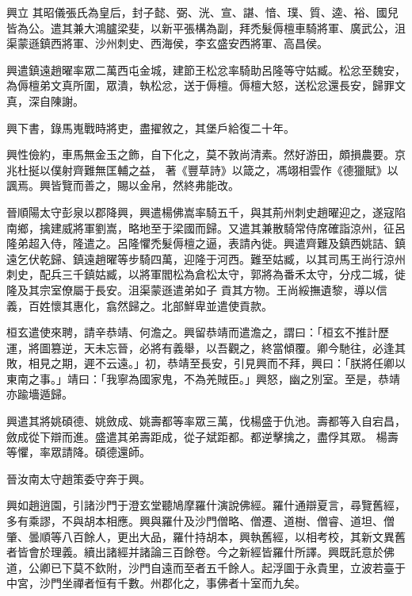 \begin{pinyinscope}
 興立
 其昭儀張氏為皇后，封子懿、弼、洸、宣、諶、愔、璞、質、逵、裕、國兒皆為公。遣其兼大鴻臚梁斐，以新平張構為副，拜禿髮傉檀車騎將軍、廣武公，沮渠蒙遜鎮西將軍、沙州刺史、西海侯，李玄盛安西將軍、高昌侯。



 興遣鎮遠趙曜率眾二萬西屯金城，建節王松忿率騎助呂隆等守姑臧。松忿至魏安，為傉檀弟文真所圍，眾潰，執松忿，送于傉檀。傉檀大怒，送松忿還長安，歸罪文真，深自陳謝。



 興下書，錄馬嵬戰時將吏，盡擢敘之，其堡戶給復二十年。



 興性儉約，車馬無金玉之飾，自下化之，莫不敦尚清素。然好游田，頗損農要。京兆杜挻以僕射齊難無匡輔之益，
 著《豐草詩》以箴之，馮翊相雲作《德獵賦》以諷焉。興皆覽而善之，賜以金帛，然終弗能改。



 晉順陽太守彭泉以郡降興，興遣楊佛嵩率騎五千，與其荊州刺史趙曜迎之，遂寇陷南鄉，擒建威將軍劉嵩，略地至于梁國而歸。又遣其兼散騎常侍席確詣涼州，征呂隆弟超入侍，隆遣之。呂隆懼禿髮傉檀之逼，表請內徙。興遣齊難及鎮西姚詰、鎮遠乞伏乾歸、鎮遠趙曜等步騎四萬，迎隆于河西。難至姑臧，以其司馬王尚行涼州刺史，配兵三千鎮姑臧，以將軍閻松為倉松太守，郭將為番禾太守，分戍二城，徙隆及其宗室僚屬于長安。沮渠蒙遜遣弟如子
 貢其方物。王尚綏撫遺黎，導以信義，百姓懷其惠化，翕然歸之。北部鮮卑並遣使貢款。



 桓玄遣使來聘，請辛恭靖、何澹之。興留恭靖而遣澹之，謂曰：「桓玄不推計歷運，將圖篡逆，天未忘晉，必將有義舉，以吾觀之，終當傾覆。卿今馳往，必逢其敗，相見之期，遲不云遠。」初，恭靖至長安，引見興而不拜，興曰：「朕將任卿以東南之事。」靖曰：「我寧為國家鬼，不為羌賊臣。」興怒，幽之別室。至是，恭靖亦踰墻遁歸。



 興遣其將姚碩德、姚斂成、姚壽都等率眾三萬，伐楊盛于仇池。壽都等入自宕昌，斂成從下辯而進。盛遣其弟壽距成，從子斌距都。都逆擊擒之，盡俘其眾。
 楊壽等懼，率眾請降。碩德還師。



 晉汝南太守趙策委守奔于興。



 興如趙逍園，引諸沙門于澄玄堂聽鳩摩羅什演說佛經。羅什通辯夏言，尋覽舊經，多有乘謬，不與胡本相應。興與羅什及沙門僧略、僧遷、道樹、僧睿、道坦、僧肇、曇順等八百餘人，更出大品，羅什持胡本，興執舊經，以相考校，其新文異舊者皆會於理義。續出諸經并諸論三百餘卷。今之新經皆羅什所譯。興既託意於佛道，公卿已下莫不欽附，沙門自遠而至者五千餘人。起浮圖于永貴里，立波若臺于中宮，沙門坐禪者恒有千數。州郡化之，事佛者十室而九矣。




\end{pinyinscope}
